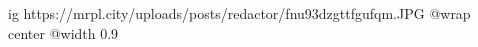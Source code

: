  
 
 
 
 

\ifcmt
  ig https://mrpl.city/uploads/posts/redactor/fnu93dzgttfgufqm.JPG
  @wrap center
  @width 0.9
\fi
